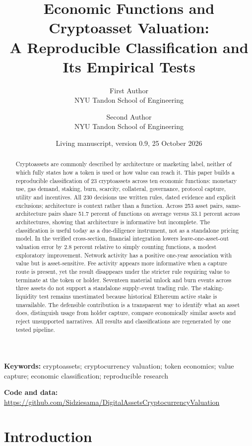 \documentclass[10pt]{article}
\title{Economic Functions and Cryptoasset Valuation:\\
A Reproducible Classification and Its Empirical Tests}
\author{First Author\\NYU Tandon School of Engineering
\and Second Author\\NYU Tandon School of Engineering}
\date{Living manuscript, version 0.9, 25 October 2026}
\begin{document}
\maketitle

\begin{abstract}
Cryptoassets are commonly described by architecture or marketing label, neither of which fully states how a token is used or how value can reach it. This paper builds a reproducible classification of 23 cryptoassets across ten economic functions: monetary use, gas demand, staking, burn, scarcity, collateral, governance, protocol capture, utility and incentives. All 230 decisions use written rules, dated evidence and explicit exclusions; architecture is context rather than a function. Across 253 asset pairs, same-architecture pairs share 51.7 percent of functions on average versus 33.1 percent across architectures, showing that architecture is informative but incomplete. The classification is useful today as a due-diligence instrument, not as a standalone pricing model. In the verified cross-section, financial integration lowers leave-one-asset-out valuation error by 2.8 percent relative to simply counting functions, a modest exploratory improvement. Network activity has a positive one-year association with value but is asset-sensitive. Fee activity appears more informative when a capture route is present, yet the result disappears under the stricter rule requiring value to terminate at the token or holder. Seventeen material unlock and burn events across three assets do not support a standalone supply-event trading rule. The staking-liquidity test remains unestimated because historical Ethereum active stake is unavailable. The defensible contribution is a transparent way to identify what an asset does, distinguish usage from holder capture, compare economically similar assets and reject unsupported narratives. All results and classifications are regenerated by one tested pipeline.
\end{abstract}

\noindent\textbf{Keywords:} cryptoassets; cryptocurrency valuation; token economics; value capture; economic classification; reproducible research

\noindent\textbf{Code and data:} \url{https://github.com/Sidziesama/DigitalAssetsCryptocurrencyValuation} \citep{repo2026}

\section{Introduction}
\end{document}
